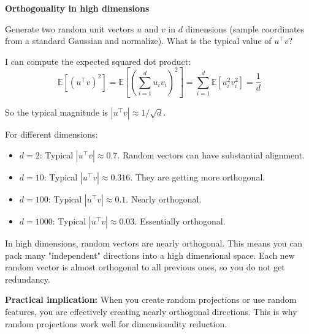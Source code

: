 \begin{examplebox}
\textbf{Orthogonality in high dimensions}

\vspace{0.5em}

Generate two random unit vectors $u$ and $v$ in $d$ dimensions (sample coordinates from a standard Gaussian and normalize). What is the typical value of $u^\top v$?

\vspace{0.5em}

I can compute the expected squared dot product:
\begin{equation*}
\mathbb{E}[(u^\top v)^2] = \mathbb{E}\left[\left(\sum_{i=1}^d u_i v_i\right)^2\right] = \sum_{i=1}^d \mathbb{E}[u_i^2 v_i^2] = \frac{1}{d}
\end{equation*}

So the typical magnitude is $|u^\top v| \approx 1/\sqrt{d}$.

\vspace{0.5em}

For different dimensions:

\begin{itemize}
\item $d = 2$: Typical $|u^\top v| \approx 0.7$. Random vectors can have substantial alignment.

\item $d = 10$: Typical $|u^\top v| \approx 0.316$. They are getting more orthogonal.

\item $d = 100$: Typical $|u^\top v| \approx 0.1$. Nearly orthogonal.

\item $d = 1000$: Typical $|u^\top v| \approx 0.03$. Essentially orthogonal.
\end{itemize}

\vspace{0.5em}

In high dimensions, random vectors are nearly orthogonal. This means you can pack many "independent" directions into a high dimensional space. Each new random vector is almost orthogonal to all previous ones, so you do not get redundancy.

\vspace{0.5em}

\textbf{Practical implication:} When you create random projections or use random features, you are effectively creating nearly orthogonal directions. This is why random projections work well for dimensionality reduction.
\end{examplebox}

